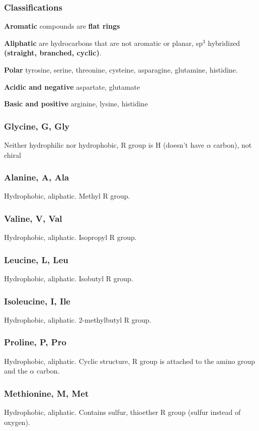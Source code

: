 \documentclass[letterpaper, 12pt]{article}
\begin{document}
\subsubsection*{Classifications}

\textbf{Aromatic} compounds are \textbf{flat rings}

\textbf{Aliphatic} are hydrocarbons that are not aromatic or planar, sp$^3$ hybridized \textbf{(straight, branched, cyclic)}.

\textbf{Polar} tyrosine, serine, threonine, cysteine, asparagine, glutamine, histidine.

\textbf{Acidic and negative} aspartate, glutamate

\textbf{Basic and positive} arginine, lysine, histidine

\subsubsection*{Glycine, G, Gly}
Neither hydrophilic nor hydrophobic, R group is H (doesn't have $\alpha$ carbon), not chiral

\subsubsection*{Alanine, A, Ala}
Hydrophobic, aliphatic. Methyl R group.

\subsubsection*{Valine, V, Val}
Hydrophobic, aliphatic. Isopropyl R group.

\subsubsection*{Leucine, L, Leu}
Hydrophobic, aliphatic. Isobutyl R group.

\subsubsection*{Isoleucine, I, Ile}
Hydrophobic, aliphatic. 2-methylbutyl R group.

\subsubsection*{Proline, P, Pro}
Hydrophobic, aliphatic. Cyclic structure, R group is attached to the amino group and the $\alpha$ carbon.

\subsubsection*{Methionine, M, Met}
Hydrophobic, aliphatic. Contains sulfur, thioether R group (sulfur instead of oxygen).
\end{document}
